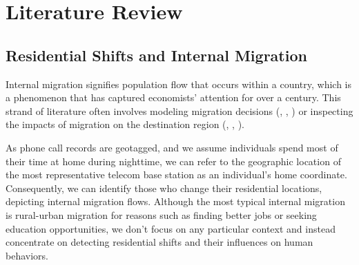 \chapter{Literature Review}
\section{Residential Shifts and Internal Migration}\label{sec:2_residential_shift_and_internal_migration}


Internal migration signifies population flow that occurs within a country, which is a phenomenon that has captured economists' attention for over a century.
This strand of literature often involves modeling migration decisions (\cite{hunt2004north}, \cite{espindola2006harris}, \cite{wang2023job}) or inspecting the impacts of migration on the destination region (\cite{boustan2010effect}, \cite{bryan2019aggregate}, \cite{imbert2022migrants}).

As phone call records are geotagged, and we assume individuals spend most of their time at home during nighttime, we can refer to the geographic location of the most representative telecom base station as an individual's home coordinate.
Consequently, we can identify those who change their residential locations, depicting internal migration flows.
Although the most typical internal migration is rural-urban migration for reasons such as finding better jobs or seeking education opportunities, we don't focus on any particular context and instead concentrate on detecting residential shifts and their influences on human behaviors.

